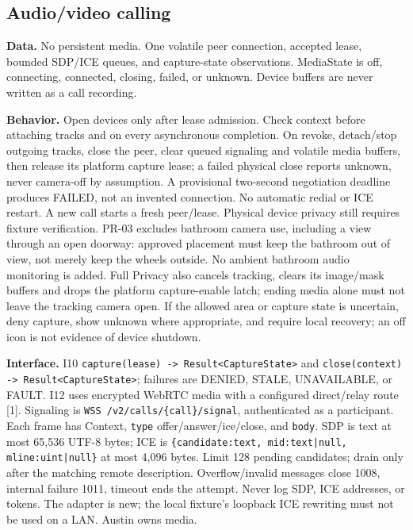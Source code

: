 \documentclass[12pt,letterpaper]{article}
\newcommand{\field}[1]{\texttt{#1}}
\begin{document}
\subsection*{Audio/video calling}
\textbf{Data.} No persistent media. One volatile peer connection, accepted lease, bounded SDP/ICE queues, and capture-state observations. MediaState is off, connecting, connected, closing, failed, or unknown. Device buffers are never written as a call recording.

\textbf{Behavior.} Open devices only after lease admission. Check context before attaching tracks and on every asynchronous completion. On revoke, detach/stop outgoing tracks, close the peer, clear queued signaling and volatile media buffers, then release its platform capture lease; a failed physical close reports unknown, never camera-off by assumption. A provisional two-second negotiation deadline produces FAILED, not an invented connection. No automatic redial or ICE restart. A new call starts a fresh peer/lease. Physical device privacy still requires fixture verification. PR-03 excludes bathroom camera use, including a view through an open doorway: approved placement must keep the bathroom out of view, not merely keep the wheels outside. No ambient bathroom audio monitoring is added. Full Privacy also cancels tracking, clears its image/mask buffers and drops the platform capture-enable latch; ending media alone must not leave the tracking camera open. If the allowed area or capture state is uncertain, deny capture, show unknown where appropriate, and require local recovery; an off icon is not evidence of device shutdown.

\textbf{Interface.} I10 \field{capture(lease) -> Result<CaptureState>} and \field{close(context) -> Result<CaptureState>}; failures are DENIED, STALE, UNAVAILABLE, or FAULT. I12 uses encrypted WebRTC media with a configured direct/relay route [1]. Signaling is \field{WSS /v2/calls/\{call\}/signal}, authenticated as a participant. Each frame has Context, \field{type} offer/answer/ice/close, and \field{body}. SDP is text at most 65,536 UTF-8 bytes; ICE is \field{\{candidate:text, mid:text|null, mline:uint|null\}} at most 4,096 bytes. Limit 128 pending candidates; drain only after the matching remote description. Overflow/invalid messages close 1008, internal failure 1011, timeout ends the attempt. Never log SDP, ICE addresses, or tokens. The adapter is new; the local fixture's loopback ICE rewriting must not be used on a LAN. Austin owns media.
\end{document}
